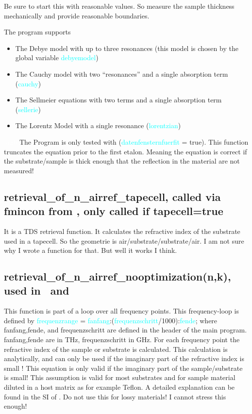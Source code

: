 \documentclass[12pt]{article}
\begin{document}
Be sure to start this with reasonable values. So measure the sample thickness mechanically and provide reasonable boundaries. 

The program supports 
\begin{itemize}
\item The Debye model with up to three resonances (this model is chosen by the global variable \textcolor{cyan}{debyemodel}) 
\item	The Cauchy model with two "`resonances"' and a single absorption term (\textcolor{cyan}{cauchy})
\item	The Sellmeier equations with two terms and  a single absorption term (\textcolor{cyan}{sellerie})
\item	The Lorentz Model with a single resonance (\textcolor{cyan}{lorentzian})
\end{itemize}
\textcolor{white}{argh}
\achtung The Program is only tested with (\textcolor{cyan}{datenfensternfuerfit} = true). This function truncates the equation prior to the first etalon. Meaning the equation is correct if the substrate/sample is thick enough that the reflection in the material are not measured! 



\subsection{retrieval\_of\_n\_airref\_tapecell, called via fmincon from \TDS, only called if tapecell=true}
It is a TDS retrieval function. It calculates the refractive index of the substrate used in a tapecell. So the geometrie is air/substrate/substrate/air.  I am not sure why I wrote a function for that. But well it works  I think.
\subsection{retrieval\_of\_n\_airref\_nooptimization(\textbf{n,k}), used in \TDS~and \pellets}
This function is part of a loop over all frequency points. This frequency-loop is defined by \textcolor{cyan}{frequenzrange} = \textcolor{cyan}{fanfang}:(\textcolor{cyan}{frequenzschritt}/1000):\textcolor{cyan}{fende}; where fanfang,fende, and frequenzschritt are defined in the header of the main program. fanfang,fende are in THz, frequenzschritt in GHz. 
For each frequency point the refractive index of the sample or substrate is calculated. This calculation is analytically, and can only be used if the imaginary part of the refractive index is small ! 
\achtung This equation is only valid if the imaginary part of the sample/substrate is small! 
This assumption is valid for most substrates and for sample material diluted in a host matrix as for example Teflon. A detailed explanation can be found in the SI of \cite{neu2017PCCP}.
Do not use this for lossy materials! I cannot stress this enough! 
\end{document}
